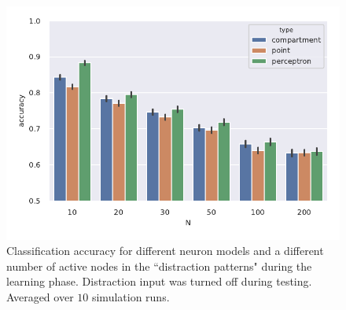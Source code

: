 \documentclass[10pt,a4paper]{article}
\begin{document}
\begin{figure}
	\includegraphics[width=\textwidth]{./figures/accuracy_distraction_patterns_distraction_during_testing.pdf}
	\caption{Classification accuracy for different neuron models and a different number of active nodes in the ``distraction patterns" during the learning phase. Distraction input was turned off during testing. Averaged over $10$ simulation runs.}
	\label{fig:distraction_patterns_2}
\end{figure}
\end{document}
